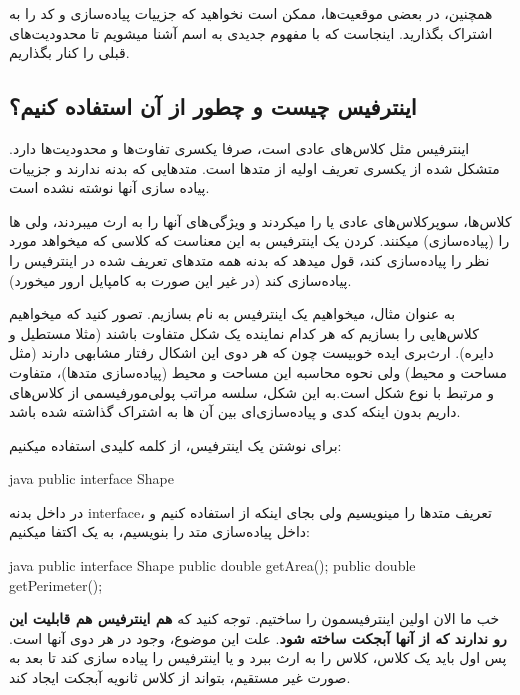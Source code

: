 همچنین، در بعضی موقعیت‌ها، ممکن است نخواهید که جزییات پیاده‌سازی و کد را
به اشتراک بگذارید. اینجاست که با مفهوم جدیدی به اسم  آشنا
میشویم تا محدودیت‌های قبلی را کنار بگذاریم.

\subsection{اینترفیس چیست و چطور از آن استفاده کنیم؟}

اینترفیس مثل کلاس‌های عادی است، صرفا یکسری تفاوت‌ها و محدودیت‌ها دارد.
 متشکل شده از یکسری تعریف اولیه از متدها است. متدهایی که
بدنه ندارند و جزییات پیاده سازی آنها نوشته نشده است.

کلاس‌ها، سوپرکلاس‌های عادی یا  را  میکردند و
ویژگی‌های آنها را به ارث میبردند، ولی  ها را 
(پیاده‌سازی) میکنند.  کردن یک اینترفیس به این معناست که
کلاسی که میخواهد  مورد نظر را پیاده‌سازی کند، قول میدهد که
بدنه همه متدهای تعریف شده در اینترفیس را پیاده‌سازی کند (در غیر این صورت
به کامپایل ارور میخورد).

به عنوان مثال، میخواهیم یک اینترفیس به نام  بسازیم.
تصور کنید که میخواهیم کلاس‌هایی را بسازیم که هر کدام نماینده یک شکل
متفاوت باشند (مثلا مستطیل و دایره). ارث‌بری ایده خوبیست چون که هر دوی این
اشکال رفتار مشابهی دارند (مثل مساحت و محیط) ولی نحوه محاسبه این مساحت و
محیط (پیاده‌سازی متدها)، متفاوت و مرتبط با نوع شکل است.به این شکل، سلسه
مراتب پولی‌مورفیسمی از کلاس‌های  داریم بدون اینکه کدی و
پیاده‌سازی‌ای بین آن ها به اشتراک گذاشته شده باشد.

برای نوشتن یک اینترفیس، از کلمه کلیدی  استفاده
میکنیم:

\begin{codebox}{java}
public interface Shape {  
}
\end{codebox}

در داخل بدنه interface، تعریف متدها را مینویسیم ولی بجای اینکه از
\lr{\texttt{\{\}}} استفاده کنیم و داخل  پیاده‌سازی متد را
بنویسیم، به یک \lr{\texttt{;}} اکتفا میکنیم:

\begin{codebox}{java}
public interface Shape {  
    public double getArea();  
    public double getPerimeter();  
}
\end{codebox}

خب ما الان اولین اینترفیسمون را ساختیم. توجه کنید که \textbf{هم اینترفیس
هم  قابلیت این رو ندارند که از آنها آبجکت ساخته شود}.
علت این موضوع، وجود  در هر دوی آنها است. پس اول
باید یک کلاس، کلاس  را به ارث ببرد و یا اینترفیس را پیاده
سازی کند تا بعد به صورت غیر مستقیم، بتواند از کلاس ثانویه آبجکت ایجاد
کند.

